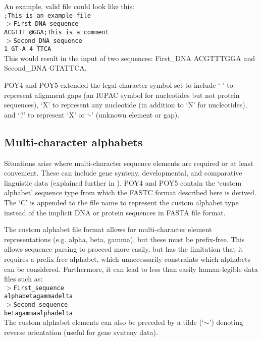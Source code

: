 \documentclass[12pt]{article}
\begin{document}
An example, valid file could look like this:\\
\texttt{;This is an example file}\\
\texttt{$>$First\_DNA sequence}\\
\texttt{ACGTTT @GGA;This is a comment}\\
\texttt{$>$Second\_DNA sequence}\\
\texttt{1 GT-A 4 TTCA }\\
This would result in the input of two sequences: First\_DNA  ACGTTTGGA and Second\_DNA GTATTCA.

POY4 \citep {POY4} and POY5 \citep {POY5, Wheeleretal2015} extended the legal character symbol set to include `-' to represent alignment gaps (an IUPAC symbol for nucleotides but not protein sequences), `X' to represent any nucleotide (in addition to `N' for nucleotides), and `?' to represent `X' or `-' (unknown element or gap).  

\subsection{Multi-character alphabets}
Situations arise where multi-character sequence elements are required or at least convenient.  These can include gene synteny, developmental, and comparative linguistic data (explained further in \citealp{SchulmeisterandWheeler2004,Wheeler2007, Wheeler2012, WheelerandWhiteley2015}).  POY4 and POY5 contain the `custom alphabet' sequence type from which the FASTC format described here is derived. The `C' is appended to the file name to represent the custom alphabet type instead of the implicit DNA or protein sequences in FASTA file format.

The custom alphabet file format allows for multi-character element representations (e.g. alpha, beta, gamma), but these must be prefix-free.  This allows sequence parsing to proceed more easily, but has the limitation that it requires a prefix-free alphabet, which unnecessarily constraints which alphabets can be considered.  Furthermore, it can lead to less than easily human-legible data files such as:\\
\texttt{$>$First\_sequence}\\
\texttt{alphabetagammadelta}\\
\texttt{$>$Second\_sequence}\\
\texttt{betagammaalphadelta}\\
The custom alphabet elements can also be preceded by a tilde (`$\sim$') denoting reverse orientation (useful for gene synteny data).
\end{document}
